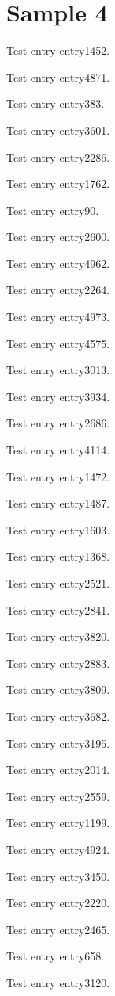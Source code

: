 \chapter{Sample 4}
Test entry \gls{entry1452}.

Test entry \gls{entry4871}.

Test entry \gls{entry383}.

Test entry \gls{entry3601}.

Test entry \gls{entry2286}.

Test entry \gls{entry1762}.

Test entry \gls{entry90}.

Test entry \gls{entry2600}.

Test entry \gls{entry4962}.

Test entry \gls{entry2264}.

Test entry \gls{entry4973}.

Test entry \gls{entry4575}.

Test entry \gls{entry3013}.

Test entry \gls{entry3934}.

Test entry \gls{entry2686}.

Test entry \gls{entry4114}.

Test entry \gls{entry1472}.

Test entry \gls{entry1487}.

Test entry \gls{entry1603}.

Test entry \gls{entry1368}.

Test entry \gls{entry2521}.

Test entry \gls{entry2841}.

Test entry \gls{entry3820}.

Test entry \gls{entry2883}.

Test entry \gls{entry3809}.

Test entry \gls{entry3682}.

Test entry \gls{entry3195}.

Test entry \gls{entry2014}.

Test entry \gls{entry2559}.

Test entry \gls{entry1199}.

Test entry \gls{entry4924}.

Test entry \gls{entry3450}.

Test entry \gls{entry2220}.

Test entry \gls{entry2465}.

Test entry \gls{entry658}.

Test entry \gls{entry3120}.

